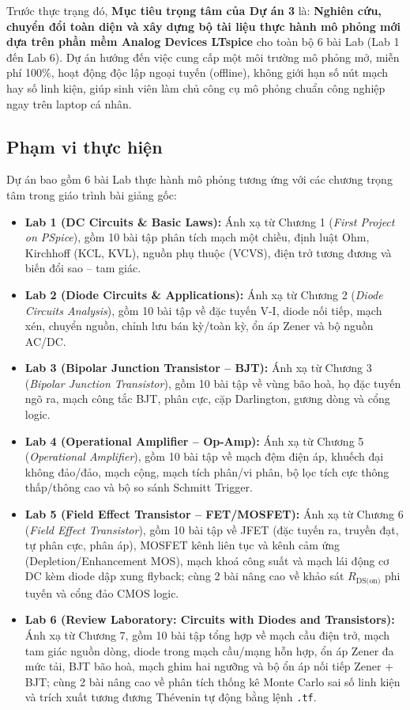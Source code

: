 \documentclass[12pt,a4paper]{article}
\begin{document}
Trước thực trạng đó, \textbf{Mục tiêu trọng tâm của Dự án 3} là: \textbf{Nghiên cứu, chuyển đổi toàn diện và xây dựng bộ tài liệu thực hành mô phỏng mới dựa trên phần mềm Analog Devices LTspice} cho toàn bộ 6 bài Lab (Lab 1 đến Lab 6). Dự án hướng đến việc cung cấp một môi trường mô phỏng mở, miễn phí 100\%, hoạt động độc lập ngoại tuyến (offline), không giới hạn số nút mạch hay số linh kiện, giúp sinh viên làm chủ công cụ mô phỏng chuẩn công nghiệp ngay trên laptop cá nhân.

\subsection{Phạm vi thực hiện}
Dự án bao gồm 6 bài Lab thực hành mô phỏng tương ứng với các chương trọng tâm trong giáo trình bài giảng gốc:
\begin{itemize}[itemsep=2pt]
  \item \textbf{Lab 1 (DC Circuits \& Basic Laws):} Ánh xạ từ Chương 1 (\textit{First Project on PSpice}), gồm 10 bài tập phân tích mạch một chiều, định luật Ohm, Kirchhoff (KCL, KVL), nguồn phụ thuộc (VCVS), điện trở tương đương và biến đổi sao -- tam giác.
  \item \textbf{Lab 2 (Diode Circuits \& Applications):} Ánh xạ từ Chương 2 (\textit{Diode Circuits Analysis}), gồm 10 bài tập về đặc tuyến V-I, diode nối tiếp, mạch xén, chuyển nguồn, chỉnh lưu bán kỳ/toàn kỳ, ổn áp Zener và bộ nguồn AC/DC.
  \item \textbf{Lab 3 (Bipolar Junction Transistor -- BJT):} Ánh xạ từ Chương 3 (\textit{Bipolar Junction Transistor}), gồm 10 bài tập về vùng bão hoà, họ đặc tuyến ngõ ra, mạch công tắc BJT, phân cực, cặp Darlington, gương dòng và cổng logic.
  \item \textbf{Lab 4 (Operational Amplifier -- Op-Amp):} Ánh xạ từ Chương 5 (\textit{Operational Amplifier}), gồm 10 bài tập về mạch đệm điện áp, khuếch đại không đảo/đảo, mạch cộng, mạch tích phân/vi phân, bộ lọc tích cực thông thấp/thông cao và bộ so sánh Schmitt Trigger.
  \item \textbf{Lab 5 (Field Effect Transistor -- FET/MOSFET):} Ánh xạ từ Chương 6 (\textit{Field Effect Transistor}), gồm 10 bài tập về JFET (đặc tuyến ra, truyền đạt, tự phân cực, phân áp), MOSFET kênh liên tục và kênh cảm ứng (Depletion/Enhancement MOS), mạch khoá công suất và mạch lái động cơ DC kèm diode dập xung flyback; cùng 2 bài nâng cao về khảo sát $R_{\text{DS(on)}}$ phi tuyến và cổng đảo CMOS logic.
  \item \textbf{Lab 6 (Review Laboratory: Circuits with Diodes and Transistors):} Ánh xạ từ Chương 7, gồm 10 bài tập tổng hợp về mạch cầu điện trở, mạch tam giác nguồn dòng, diode trong mạch cầu/mạng hỗn hợp, ổn áp Zener đa mức tải, BJT bão hoà, mạch ghim hai ngưỡng và bộ ổn áp nối tiếp Zener + BJT; cùng 2 bài nâng cao về phân tích thống kê Monte Carlo sai số linh kiện và trích xuất tương đương Thévenin tự động bằng lệnh \texttt{.tf}.
\end{itemize}
\end{document}
